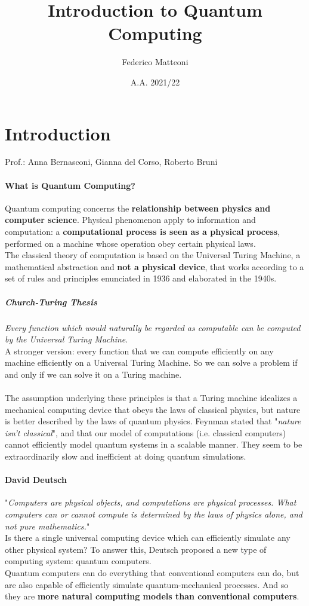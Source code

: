 \documentclass[10pt]{report}
\begin{document}
\title{Introduction to Quantum Computing}
\author{Federico Matteoni}
\date{A.A. 2021/22}
\renewcommand*\contentsname{Index}

\maketitle
\tableofcontents
\pagebreak
\section{Introduction}
Prof.: Anna Bernasconi, Gianna del Corso, Roberto Bruni
\paragraph{What is Quantum Computing?} Quantum computing concerns the \textbf{relationship between physics and computer science}. Physical phenomenon apply to information and computation: a \textbf{computational process is seen as a physical process}, performed on a machine whose operation obey certain physical laws.\\
The classical theory of computation is based on the Universal Turing Machine, a mathematical abstraction and \textbf{not a physical device}, that works according to a set of rules and principles enunciated in 1936 and elaborated in the 1940s.
\subparagraph{Church-Turing Thesis} \textit{Every function which would naturally be regarded as computable can be computed by the Universal Turing Machine}.\\
A stronger version: every function that we can compute efficiently on any machine efficiently on a Universal Turing Machine. So we can solve a problem if and only if we can solve it on a Turing machine.\\\\
The assumption underlying these principles is that a Turing machine idealizes a mechanical computing device that obeys the laws of classical physics, but nature is better described by the laws of quantum physics. Feynman stated that "\textit{nature isn't classical}", and that our model of computations (i.e. classical computers) cannot efficiently model quantum systems in a scalable manner. They seem to be extraordinarily slow and inefficient at doing quantum simulations.
\paragraph{David Deutsch} "\textit{Computers are physical objects, and computations are physical processes. What computers can or cannot compute is determined by the laws of physics alone, and not pure mathematics.}"\\
Is there a single universal computing device which can efficiently simulate any other physical system? To answer this, Deutsch proposed a new type of computing system: quantum computers.\\
Quantum computers can do everything that conventional computers can do, but are also capable of efficiently simulate quantum-mechanical processes. And so they are \textbf{more natural computing models than conventional computers}.
\end{document}
